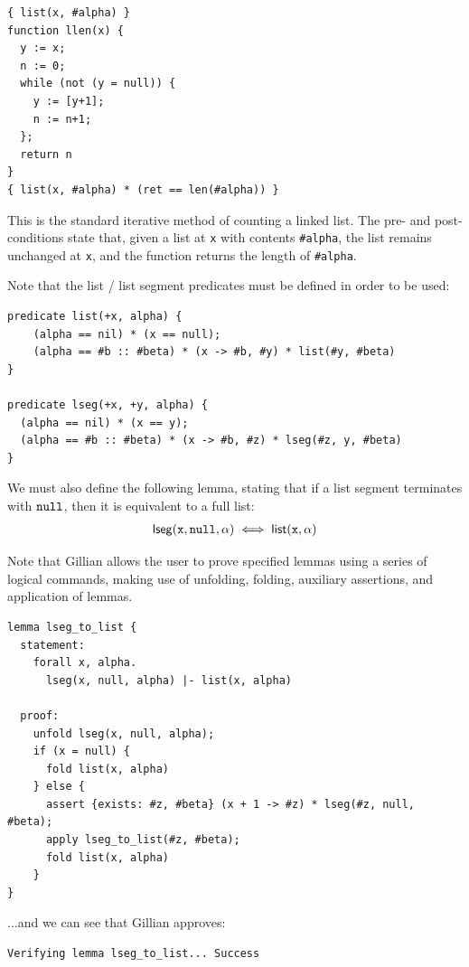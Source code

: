 \begin{lstlisting}[numbers=none, caption={Verification example - list length in WISL}, style=code]
{ list(x, #alpha) }
function llen(x) {
  y := x;
  n := 0;
  while (not (y = null)) {
    y := [y+1];
    n := n+1;
  };
  return n
}
{ list(x, #alpha) * (ret == len(#alpha)) }
\end{lstlisting}

This is the standard iterative method of counting a linked list. The pre- and post-conditions state that, given a list at \texttt{x} with contents \texttt{\#alpha}, the list remains unchanged at \texttt{x}, and the function returns the length of \texttt{\#alpha}.

Note that the list / list segment predicates must be defined in order to be used:

\begin{lstlisting}[caption={List predicates in WISL}, style=code, numbers=none]
predicate list(+x, alpha) {
    (alpha == nil) * (x == null);
    (alpha == #b :: #beta) * (x -> #b, #y) * list(#y, #beta)
}

predicate lseg(+x, +y, alpha) {
  (alpha == nil) * (x == y);
  (alpha == #b :: #beta) * (x -> #b, #z) * lseg(#z, y, #beta)
}
\end{lstlisting}

We must also define the following lemma, stating that if a list segment
terminates with $\mathtt{null}$, then it is equivalent to a full list:
\begin{align*}
  \mathsf{lseg}(\mathtt{x}, \mathtt{null}, \alpha) \iff \mathsf{list}(\mathtt{x}, \alpha)
\end{align*}

Note that Gillian allows the user to prove specified lemmas using a series of logical commands, making use of unfolding, folding, auxiliary assertions, and application of lemmas.

\begin{lstlisting}[caption={List lemma in WISL}, style=code, numbers=none]
lemma lseg_to_list {
  statement:
    forall x, alpha.
      lseg(x, null, alpha) |- list(x, alpha)

  proof:
    unfold lseg(x, null, alpha);
    if (x = null) {
      fold list(x, alpha)
    } else {
      assert {exists: #z, #beta} (x + 1 -> #z) * lseg(#z, null, #beta);
      apply lseg_to_list(#z, #beta);
      fold list(x, alpha)
    }
}
\end{lstlisting}

...and we can see that Gillian approves:

\begin{lstlisting}[style=code, numbers=none, caption={List lemma in WISL - Gillian output}]
Verifying lemma lseg_to_list... Success
\end{lstlisting}

